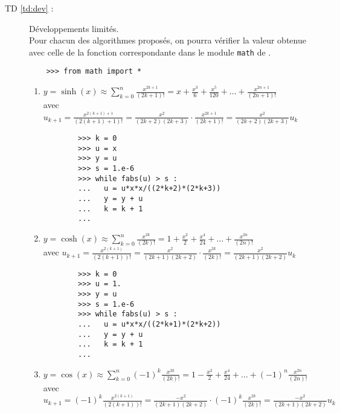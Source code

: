 \begin{description}
\item[TD \ref{td:dev} :] Développements limités.\\
	Pour chacun des algorithmes proposés, on pourra vérifier la valeur
	obtenue avec celle de la fonction correspondante dans le module {\tt math} 
	de \python.

	\begin{py}{12cm}
	\begin{verbatim}
	>>> from math import *
	\end{verbatim}
	\end{py}

	\begin{enumerate}
	\item $\displaystyle y = \sinh(x) \approx \sum_{k=0}^{n} \frac{x^{2k+1}}{(2k+1)!} = 
		x + \frac{x^3}{6} + \frac{x^5}{120} + \ldots + \frac{x^{2n+1}}{(2n+1)!}$\\\mbox{}\hfill
		avec
		$\displaystyle u_{k+1} = \frac{x^{2(k+1)+1}}{(2(k+1)+1)!} = \frac{x^2}{(2k+2)(2k+3)}\cdot\frac{x^{2k+1}}{(2k+1)!} 
		= \frac{x^2}{(2k+2)(2k+3)}u_k$

		\begin{py}{12cm}
		\begin{verbatim}
		>>> k = 0
		>>> u = x
		>>> y = u
		>>> s = 1.e-6
		>>> while fabs(u) > s :
		...   u = u*x*x/((2*k+2)*(2*k+3))
		...   y = y + u
		...   k = k + 1
		... 
		\end{verbatim}
		\end{py}

	\item $\displaystyle y = \cosh(x) \approx \sum_{k=0}^{n} \frac{x^{2k}}{(2k)!} = 
		1 + \frac{x^2}{2} + \frac{x^4}{24} + \ldots + \frac{x^{2n}}{(2n)!}$\\\mbox{}\hfill
		avec
		$\displaystyle u_{k+1} = \frac{x^{2(k+1)}}{(2(k+1))!} = \frac{x^2}{(2k+1)(2k+2)}\cdot\frac{x^{2k}}{(2k)!} 
		= \frac{x^2}{(2k+1)(2k+2)}u_k$

		\begin{py}{12cm}
		\begin{verbatim}
		>>> k = 0
		>>> u = 1.
		>>> y = u
		>>> s = 1.e-6
		>>> while fabs(u) > s :
		...   u = u*x*x/((2*k+1)*(2*k+2))
		...   y = y + u
		...   k = k + 1
		... 
		\end{verbatim}
		\end{py}

	\item $\displaystyle y = \cos(x) \approx \sum_{k=0}^{n} (-1)^k\frac{x^{2k}}{(2k)!} = 
		1 - \frac{x^2}{2} + \frac{x^4}{24} + \ldots + (-1)^n\frac{x^{2n}}{(2n)!}$\\\mbox{}\hfill
		avec
		$\displaystyle u_{k+1} = (-1)^k\frac{x^{2(k+1)}}{(2(k+1))!} = \frac{-x^2}{(2k+1)(2k+2)}\cdot(-1)^k\frac{x^{2k}}{(2k)!}
		= \frac{-x^2}{(2k+1)(2k+2)}u_k$


\end{enumerate}
\end{description}
